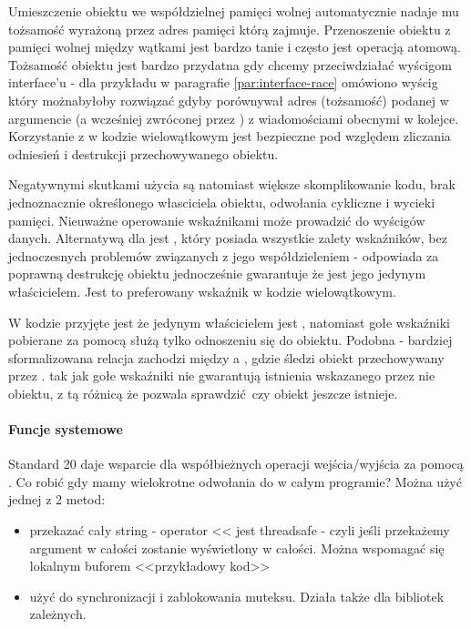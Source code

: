 Umieszczenie obiektu we współdzielnej pamięci wolnej automatycznie nadaje mu tożsamość wyrażoną przez adres pamięci którą zajmuje. Przenoszenie obiektu z pamięci wolnej między wątkami jest bardzo tanie i często jest operacją atomową. Tożsamość obiektu jest bardzo przydatna gdy chcemy przeciwdziałać wyścigom interface'u - dla przykładu w paragrafie \ref{par:interface-race} omówiono wyścig który możnabyłoby rozwiązać gdyby  porównywał adres (tożsamość) podanej w argumencie (a wcześniej zwróconej przez ) z wiadomościami obecnymi w kolejce. Korzystanie z  w kodzie wielowątkowym jest bezpieczne pod względem zliczania odniesień i destrukcji przechowywanego obiektu.

Negatywnymi skutkami użycia  są natomiast większe skomplikowanie kodu, brak jednoznacznie określonego własciciela obiektu, odwołania cykliczne i wycieki pamięci. Nieuważne operowanie wskaźnikami może prowadzić do wyścigów danych.
Alternatywą dla  jest , który posiada wszystkie zalety wskaźników, bez jednoczesnych problemów związanych z jego współdzieleniem - odpowiada za poprawną destrukcję obiektu jednocześnie gwarantuje że jest jego jedynym właścicielem. Jest to preferowany wskaźnik w kodzie wielowątkowym.

W kodzie przyjęte jest że jedynym właścicielem jest , natomiast gołe wskaźniki pobierane za pomocą  służą tylko odnoszeniu się do obiektu.
Podobna - bardziej sformalizowana relacja zachodzi między  a , gdzie  śledzi obiekt przechowywany przez .
 tak jak gołe wskaźniki nie gwarantują istnienia wskazanego przez nie obiektu, z tą różnicą że  pozwala sprawdzić czy obiekt jeszcze istnieje.

\paragraph{Funcje systemowe}
Standard \Cpp{}20 daje wsparcie dla współbieżnych operacji wejścia/wyjścia za pomocą . Co robić gdy mamy wielokrotne odwołania do  w całym programie? Można użyć jednej z 2 metod:
\begin{itemize}
\item przekazać cały string - operator <{}< jest threadsafe - czyli jeśli przekażemy argument w całości zostanie wyświetlony w całości. Można wspomagać się lokalnym buforem <<przykładowy kod>>
\item użyć  do synchronizacji i zablokowania muteksu. Działa także dla bibliotek zależnych.
\end{itemize}

